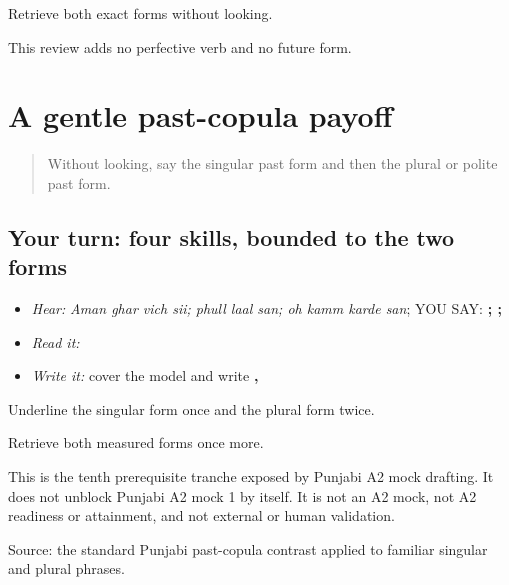 \begin{tcolorbox}[breakable,colback=teal!4,colframe=teal!35!black,title={Before you move on}]
Retrieve both exact forms without looking.

This review adds no perfective verb and no future form.
\end{tcolorbox}
\section[\texorpdfstring{\pa{ਅਮਨ} \pa{ਘਰ} \pa{ਵਿੱਚ} \pa{ਸੀ} … (Aman ghar vich …)}{ਅਮਨ ਘਰ ਵਿੱਚ ਸੀ … (Aman ghar vich …)}]{A gentle past-copula payoff}

\label{lesson:PA-C187-payoff}



\begin{quote}
Without looking, say the singular past form and then the plural or polite past form.
\end{quote}

\subsection*{Your turn: four skills, bounded to the two forms}
\begin{itemize}
\raggedright
  \item \emph{Hear:} \emph{Aman ghar vich sii; phull laal san; oh kamm karde san}; YOU SAY: \textbf{   ;   ;    }
  \item \emph{Read it:} \textbf{          }
  \item \emph{Write it:} cover the model and write \textbf{, }
\end{itemize}

Underline the singular form once and the plural form twice.

\begin{tcolorbox}[breakable,colback=teal!4,colframe=teal!35!black,title={Before you move on}]
Retrieve both measured forms once more.

This is the tenth prerequisite tranche exposed by Punjabi A2 mock drafting. It does not unblock Punjabi A2 mock 1 by itself. It is not an A2 mock, not A2 readiness or attainment, and not external or human validation.

Source: the standard Punjabi past-copula contrast applied to familiar singular and plural phrases.
\end{tcolorbox}

